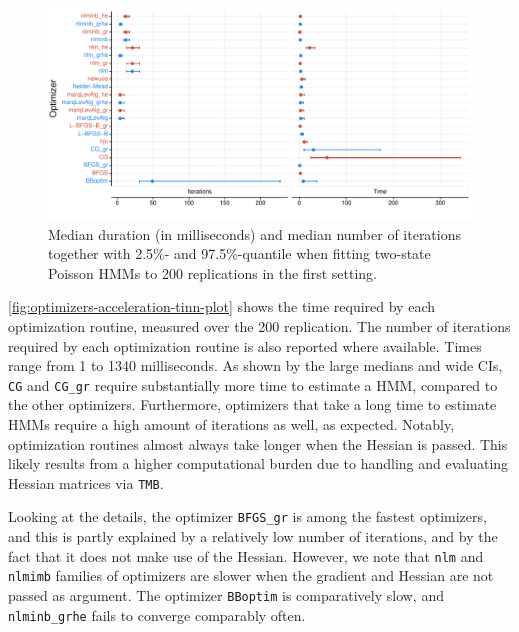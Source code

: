\documentclass[]{interact}\usepackage[]{graphicx}\usepackage[dvipsnames]{xcolor}
\makeatletter
\def\maxwidth{ %
  \ifdim\Gin@nat@width>\linewidth
    \linewidth
  \else
    \Gin@nat@width
  \fi
}
\newenvironment{knitrout}{}{} %
\theoremstyle{plain}%
\theoremstyle{definition}
\theoremstyle{remark}
\makeatother
\begin{document}
\begin{knitrout}
\color{fgcolor}\begin{figure}[htb]

{\centering \includegraphics[width=\maxwidth]{figure/optimizers-acceleration-tinn-plot-1} 

}

\caption[Median duration (in milliseconds) and median number of iterations together with 2.5\%- and 97.5\%-quantile when fitting two-state Poisson HMMs to 200 replications in the first setting]{Median duration (in milliseconds) and median number of iterations together with 2.5\%- and 97.5\%-quantile when fitting two-state Poisson HMMs to 200 replications in the first setting.}\label{fig:optimizers-acceleration-tinn-plot}
\end{figure}

\end{knitrout}



\autoref{fig:optimizers-acceleration-tinn-plot} shows the time required by each optimization routine, measured over the 200 replication. The number of iterations required by each optimization routine is also reported where available. Times range from 1 to 1340 milliseconds.
As shown by the large medians and wide CIs, \texttt{CG} and \texttt{CG\_gr} require substantially more time to estimate a HMM, compared to the other optimizers.
Furthermore, optimizers that take a long time to estimate HMMs require a high amount of iterations as well, as expected.
Notably, optimization routines almost always take longer when the Hessian is passed.
This likely results from a higher computational burden due to handling and evaluating Hessian matrices via {\tt{TMB}}.

Looking at the details, the optimizer \texttt{BFGS\_gr} is among the fastest optimizers, and this is partly explained by a relatively low number of iterations, and by the fact that it does not make use of the Hessian. 
However, we note that \texttt{nlm} and \texttt{nlmimb} families of optimizers are slower when the gradient and Hessian are not passed as argument.
The optimizer \texttt{BBoptim} is comparatively slow, and \texttt{nlminb\_grhe} fails to converge comparably often.
\end{document}
